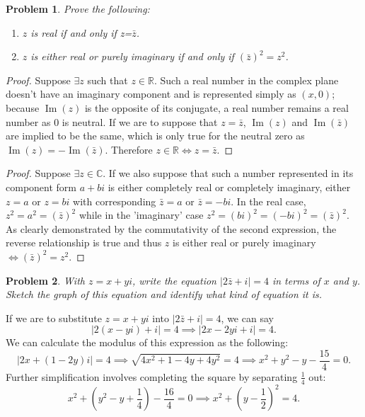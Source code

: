 \documentclass[12pt]{article}
\newtheorem{problem}{Problem}
\numberwithin{problem}{section} %
\theoremstyle{remark}  %
\begin{document}
\vspace{1em}
\begin{problem}
    Prove the following:
    \begin{enumerate}[label=(\alph*)]
        \item $z$ is real if and only if z=$\bar{z}$.
        \item $z$ is either real or purely imaginary if and only if $(\bar{z})^2=z^2$.
    \end{enumerate}
\end{problem}
\begin{proof}
    Suppose $\exists z$ such that $z \in \mathbb{R}$. Such a real number in the complex plane doesn't have an imaginary component and is represented simply as $(x,0)$; because $\operatorname{Im}(z)$ is the opposite of its conjugate, a real number remains a real number as 0 is neutral. If we are to suppose that $z=\bar{z}$, $\operatorname{Im}(z)$ and $\operatorname{Im}(\bar{z})$ are implied to be the same, which is only true for the neutral zero as $\operatorname{Im}(z)=-\operatorname{Im}(\bar{z})$. Therefore $z\in\mathbb{R}\iff z=\bar{z}$.
\end{proof}
\begin{proof}
    Suppose $\exists z \in \mathbb{C}$. If we also suppose that such a number represented in its component form $a+bi$ is either completely real or completely imaginary, either $z=a$ or $z=bi$ with corresponding $\bar{z}=a$ or $\bar{z}=-bi$. In the real case, $z^2=a^2=(\bar{z})^2$ while in the 'imaginary' case $z^2=(bi)^2=(-bi)^2=(\bar{z})^2$. As clearly demonstrated by the commutativity of the second expression, the reverse relationship is true and thus $z$ is either real or purely imaginary $\iff (\bar{z})^2=z^2$.
\end{proof}

\vspace{1em}
\begin{problem}
    With $z=x+yi$, write the equation $|2\bar{z}+i|=4$ in terms of $x$ and $y$. Sketch the graph of this equation and identify what kind of equation it is.
\end{problem}
If we are to substitute $z=x+yi$ into $|2\bar{z}+i|=4$, we can say $$|2(x-yi)+i|=4\implies |2x-2yi+i|=4.$$ We can calculate the modulus of this expression as the following: $$|2x + (1-2y)i|=4\implies \sqrt{4x^2 + 1 - 4y + 4y^2}=4\implies x^2+y^2-y-\frac{15}{4}=0.$$ Further simplification involves completing the square by separating $\frac{1}{4}$ out: $$x^2+(y^2-y+\frac{1}{4})-\frac{16}{4}=0\implies x^2+(y-\frac{1}{2})^2=4.$$ 
\end{document}
